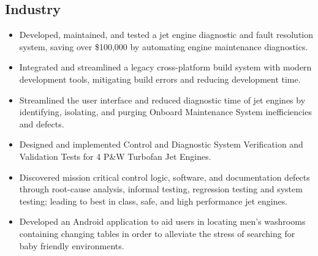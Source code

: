 \documentclass[11pt,a4paper,sans]{moderncv} %
\begin{document}
\subsection{Industry}

{
	\begin{itemize}
		\item Developed, maintained, and tested a jet engine diagnostic and fault resolution system, saving over \$100,000 by automating engine maintenance diagnostics.
		\item Integrated and streamlined a legacy cross-platform build system with modern development tools, mitigating build errors and reducing development time.
	\end{itemize}
}


{
\begin{itemize}
	\item Streamlined the user interface and reduced diagnostic time of jet engines by identifying, isolating, and purging Onboard Maintenance System inefficiencies and defects.
\end{itemize}
}


{
\begin{itemize}
	\item Designed and implemented Control and Diagnostic System Verification and Validation Tests for 4 P\&W Turbofan Jet Engines. 
	\item Discovered mission critical control logic, software, and documentation defects through root-cause analysis, informal testing, regression testing and system testing; leading to best in class, safe, and high performance jet engines.
\end{itemize}
}


{
\begin{itemize}
	\item Developed an Android application to aid users in locating men's washrooms containing changing tables in order to alleviate the stress of searching for baby friendly environments.
\end{itemize}
}
\end{document}
